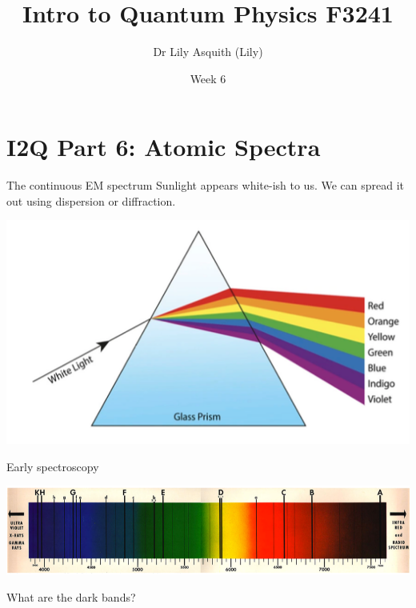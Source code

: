 


% 
\title[ Intro to Quantum Physics]{Intro to Quantum Physics F3241}
\author[Dr Lily Asquith (Lily)]{ Dr Lily Asquith (Lily)}
\date[Week 6]{ Week 6}





\begin{frame}
\titlepage
\end{frame} 


\section{I2Q Part 6: Atomic Spectra}

 
 \begin{frame}{The continuous EM spectrum}
\small
Sunlight appears white-ish to us. We can spread it out using dispersion or diffraction.

\includegraphics[scale=0.4]{spec1}

\end{frame}

 \begin{frame}{Early spectroscopy}

\includegraphics[scale=0.4]{spec2}
\small

What are the dark bands?
\vspace{5cm}

\end{frame}

